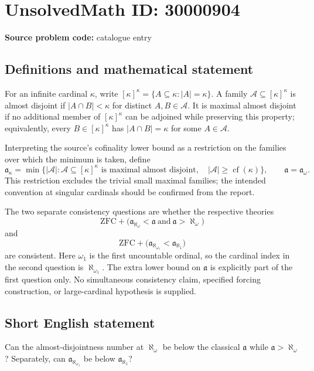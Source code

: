 \documentclass[11pt]{article}
\begin{document}
\section*{UnsolvedMath ID: 30000904}
\textbf{Source problem code:} catalogue entry
\subsection{Definitions and mathematical statement}
For an infinite cardinal \(\kappa\), write \([\kappa]^\kappa=\{A\subseteq\kappa:|A|=\kappa\}\). A family \(\mathcal A\subseteq[\kappa]^\kappa\) is almost disjoint if \(|A\cap B|<\kappa\) for distinct \(A,B\in\mathcal A\). It is maximal almost disjoint if no additional member of \([\kappa]^\kappa\) can be adjoined while preserving this property; equivalently, every \(B\in[\kappa]^\kappa\) has \(|A\cap B|=\kappa\) for some \(A\in\mathcal A\).

Interpreting the source's cofinality lower bound as a restriction on the families over which the minimum is taken, define
\[
\mathfrak a_\kappa=\min\{|\mathcal A|:
\mathcal A\subseteq[\kappa]^\kappa\text{ is maximal almost disjoint},\quad
|\mathcal A|\geq\operatorname{cf}(\kappa)\},
\qquad \mathfrak a=\mathfrak a_\omega.
\]
This restriction excludes the trivial small maximal families; the intended convention at singular cardinals should be confirmed from the report.

The two separate consistency questions are whether the respective theories
\[
\mathrm{ZFC}+\bigl(\mathfrak a_{\aleph_\omega}<\mathfrak a
\ \text{and}\ \mathfrak a>\aleph_\omega\bigr)
\]
and
\[
\mathrm{ZFC}+\bigl(\mathfrak a_{\aleph_{\omega_1}}<\mathfrak a_{\aleph_1}\bigr)
\]
are consistent. Here \(\omega_1\) is the first uncountable ordinal, so the cardinal index in the second question is \(\aleph_{\omega_1}\). The extra lower bound on \(\mathfrak a\) is explicitly part of the first question only. No simultaneous consistency claim, specified forcing construction, or large-cardinal hypothesis is supplied.
\subsection{Short English statement}
Can the almost-disjointness number at \(\aleph_\omega\) be below the classical \(\mathfrak a\) while \(\mathfrak a>\aleph_\omega\)? Separately, can \(\mathfrak a_{\aleph_{\omega_1}}\) be below \(\mathfrak a_{\aleph_1}\)?
\end{document}
